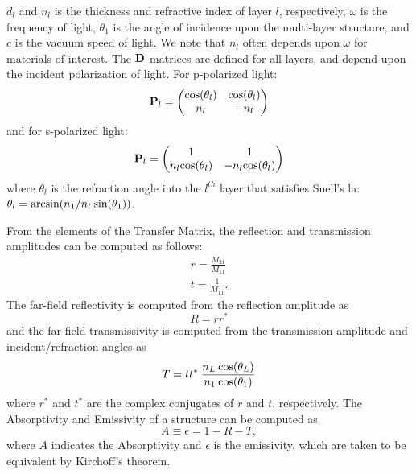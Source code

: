 \documentclass[journal=jpclcd,manuscript=suppinfo]{achemso}
\begin{document}
$d_l$ and $n_l$ is the thickness and refractive index of layer $l$, respectively, 
$\omega$ is the frequency of light, $\theta_1$ is the angle of incidence upon the 
multi-layer structure, and $c$ is the vacuum speed of light.  We note that 
$n_l$ often depends upon $\omega$ for materials of interest.  
The ${\bf D}$ matrices are defined for all layers, and depend upon the incident
polarization of light.  For p-polarized light:
\begin{equation}
{\bf P}_l = 
\begin{pmatrix}
    {\rm cos}(\theta_l)    &     {\rm cos}(\theta_l)   \\
    n_l    &     -n_l   
\end{pmatrix}
\end{equation}
and for s-polarized light:
\begin{equation}
{\bf P}_l = 
\begin{pmatrix}
    1 &     1   \\
    n_l {\rm cos}(\theta_l)    &     -n_l {\rm cos}(\theta_l)    
\end{pmatrix}
\end{equation}
where $\theta_l$ is the refraction angle into the $l^{th}$ layer that satisfies Snell's 
la: $\theta_l = {\rm arcsin}(n_1/n_l \: {\rm sin}(\theta_1))$.

From the elements of the Transfer Matrix, the reflection and transmission amplitudes
can be computed as follows:
\begin{align}
r = \frac{M_{21}}{M_{11}} \\
t = \frac{1}{M_{11}}.
\end{align}
The far-field reflectivity is computed from the reflection amplitude as
\begin{equation}
R = r r^*
\end{equation}
and the far-field transmissivity is computed from the transmission amplitude and 
incident/refraction angles as 
\begin{equation}
T = t t^* \: \frac{n_L \: {\rm cos}(\theta_L)}{n_1 \: {\rm cos}(\theta_1)}
\end{equation}
where $r^*$ and $t^*$ are the complex conjugates of $r$ and $t$, respectively.
The Absorptivity and Emissivity of a structure can be computed as
\begin{equation}
A \equiv \epsilon = 1 - R - T,
\end{equation}
where $A$ indicates the Absorptivity and $\epsilon$ is the emissivity, which are taken
to be equivalent by Kirchoff's theorem.
\end{document}
